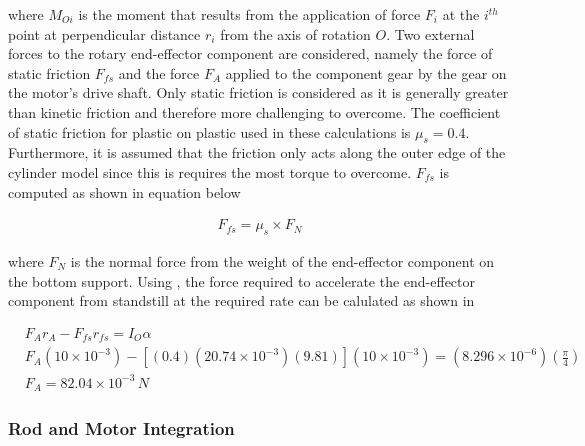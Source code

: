 where $M_{Oi}$ is the moment that results from the application of force $F_i$ at the $i^{th}$ point at perpendicular distance $r_i$ from the axis of rotation $O$. Two external forces to the rotary end-effector component are considered, namely the force of static friction $F_{fs}$ and the force $F_A$ applied to the component gear by the gear on the motor's drive shaft. Only static friction is considered as it is generally greater than kinetic friction and therefore more challenging to overcome. The coefficient of static friction for plastic on plastic used in these calculations is $\mu _s = 0.4$. Furthermore, it is assumed that the friction only acts along the outer edge of the cylinder model since this is requires the most torque to overcome. $F_{fs}$ is computed as shown in equation  below

\begin{align}
    F_{fs}=\mu _s \times F_N
    \label{eqn:static-friction}
\end{align}

where $F_N$ is the normal force from the weight of the end-effector component on the bottom support. Using , the force required to accelerate the end-effector component from standstill at the required rate can be calulated as shown in 

\begin{align}
    &F_A r_A - F_{fs} r_{fs} = I_O \alpha
    \label{eqn:Fa-required} \\
    &F_A (10 \times 10^{-3}) - [(0.4)(20.74 \times 10^{-3})(9.81)] (10 \times 10^{-3}) = (8.296 \times 10^{-6})\left(\frac{\pi}{4}\right) \\
    &F_A = 82.04 \times 10^{-3} \, N
\end{align}



\subsubsection{Rod and Motor Integration}





\pendsign